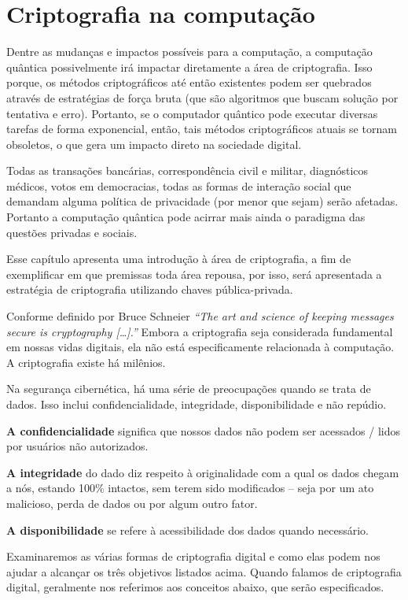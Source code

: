 \section{Criptografia na computação}
\label{criptography}
Dentre as mudanças e impactos possíveis para a computação, a computação quântica possivelmente irá impactar diretamente a área de criptografia. Isso porque, os métodos criptográficos até então existentes podem ser quebrados através de estratégias de força bruta (que são algoritmos que buscam solução por tentativa e erro). Portanto, se o computador quântico pode executar diversas tarefas de forma exponencial, então, tais métodos criptográficos atuais se tornam obsoletos, o que gera um impacto direto na sociedade digital.

Todas as transações bancárias, correspondência civil e militar, diagnósticos médicos, votos em democracias, todas as formas de interação social que demandam alguma política de privacidade (por menor que sejam) serão afetadas. Portanto a computação quântica pode acirrar mais ainda o paradigma das questões privadas e sociais.

Esse capítulo apresenta uma introdução à área de criptografia, a fim de exemplificar em que premissas toda área repousa, por isso, será apresentada a estratégia de criptografia utilizando chaves pública-privada.

Conforme definido por Bruce Schneier \textit{``The art and science of keeping messages secure is cryptography […].''} \cite{13} Embora a criptografia seja considerada fundamental em nossas vidas digitais, ela não está especificamente relacionada à computação. A criptografia existe há milênios.

Na segurança cibernética, há uma série de preocupações quando se trata de dados. Isso inclui confidencialidade, integridade, disponibilidade e não repúdio.

\textbf{A confidencialidade} significa que nossos dados não podem ser acessados / lidos por usuários não autorizados.

\textbf{A integridade} do dado diz respeito à originalidade com a qual os dados chegam a nós, estando 100\% intactos, sem terem sido modificados – seja por um ato malicioso, perda de dados ou por algum outro fator. 

\textbf{A disponibilidade} se refere à acessibilidade dos dados quando necessário.

Examinaremos as várias formas de criptografia digital e como elas podem nos ajudar a alcançar os três objetivos listados acima. Quando falamos de criptografia digital, geralmente nos referimos aos conceitos abaixo, que serão especificados.

